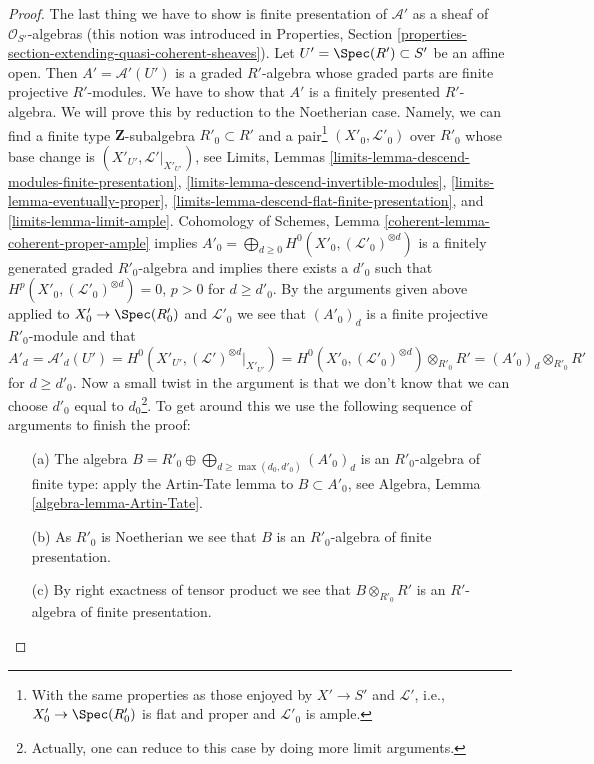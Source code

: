 \begin{proof}
\medskip\noindent
The last thing we have to show is finite presentation of
$\mathcal{A}'$ as a sheaf of $\mathcal{O}_{S'}$-algebras
(this notion was introduced in Properties, Section
\ref{properties-section-extending-quasi-coherent-sheaves}).
Let $U' = \Spec(R') \subset S'$ be an affine open.
Then $A' = \mathcal{A}'(U')$ is a graded $R'$-algebra
whose graded parts are finite projective $R'$-modules.
We have to show that $A'$ is a finitely presented $R'$-algebra.
We will prove this by reduction to the Noetherian case.
Namely, we can find a finite type $\mathbf{Z}$-subalgebra
$R'_0 \subset R'$ and a pair\footnote{With the same properties
as those enjoyed by $X' \to S'$ and $\mathcal{L}'$, i.e.,
$X'_0 \to \Spec(R'_0)$ is flat and proper and $\mathcal{L}'_0$
is ample.} $(X'_0, \mathcal{L}'_0)$ over $R'_0$
whose base change is $(X'_{U'}, \mathcal{L}'|_{X'_{U'}})$, see
Limits, Lemmas
\ref{limits-lemma-descend-modules-finite-presentation},
\ref{limits-lemma-descend-invertible-modules},
\ref{limits-lemma-eventually-proper},
\ref{limits-lemma-descend-flat-finite-presentation}, and
\ref{limits-lemma-limit-ample}.
Cohomology of Schemes, Lemma \ref{coherent-lemma-coherent-proper-ample}
implies
$A'_0 = \bigoplus_{d \geq 0} H^0(X'_0, (\mathcal{L}'_0)^{\otimes d})$
is a finitely generated graded $R'_0$-algebra and implies
there exists a $d'_0$ such that
$H^p(X'_0, (\mathcal{L}'_0)^{\otimes d}) = 0$, $p > 0$ for $d \geq d'_0$.
By the arguments given above applied to $X'_0 \to \Spec(R'_0)$ and
$\mathcal{L}'_0$ we see that $(A'_0)_d$ is a finite projective $R'_0$-module
and that
$$
A'_d = \mathcal{A}'_d(U') =
H^0(X'_{U'}, (\mathcal{L}')^{\otimes d}|_{X'_{U'}}) =
H^0(X'_0, (\mathcal{L}'_0)^{\otimes d}) \otimes_{R'_0} R' =
(A'_0)_d \otimes_{R'_0} R'
$$
for $d \geq d'_0$. Now a small twist in the argument is that we
don't know that we can choose $d'_0$ equal to $d_0$\footnote{Actually,
one can reduce to this case by doing more limit arguments.}. To
get around this we use the following sequence of arguments to finish
the proof:
\begin{enumerate}
\item[(a)] The algebra
$B = R'_0 \oplus \bigoplus_{d \geq \max(d_0, d'_0)} (A'_0)_d$
is an $R'_0$-algebra of finite type: apply
the Artin-Tate lemma to $B \subset A'_0$, see
Algebra, Lemma \ref{algebra-lemma-Artin-Tate}.
\item[(b)] As $R'_0$ is Noetherian we see that
$B$ is an $R'_0$-algebra of finite presentation.
\item[(c)] By right exactness of tensor product we see that
$B \otimes_{R'_0} R'$ is an $R'$-algebra of finite presentation.

\end{enumerate}
\end{proof}
